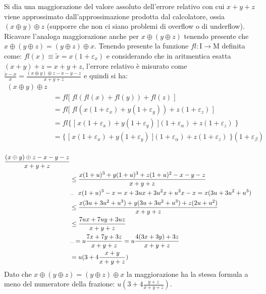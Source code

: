 Si dia una maggiorazione del valore assoluto dell’errore relativo con cui $x + y + z$ viene approssimato dall’approssimazione prodotta dal calcolatore, ossia $(x \oplus y) \oplus z$ (supporre che non ci siano problemi di overflow o di underflow). Ricavare l’analoga maggiorazione anche per $x \oplus (y \oplus z)$ tenendo presente che $x \oplus (y \oplus z) = (y \oplus z) \oplus x$.
\PP
Tenendo presente la funzione $fl: \mathrm{I} \rightarrow \mathrm{M}$ definita come: $fl(x) \equiv \tilde{x} = x(1+\varepsilon_x)$ e considerando che in aritmentica esatta $(x+y)+z = x+y+z$, l'errore relativo è misurato come $\frac{\tilde{x}-x}{x} = \frac{(x \oplus y) \oplus z - x - y - z}{x+y+z}$ e quindi si ha:
\begin{equation*}
	\begin{split}
		(x \oplus y) \oplus z \\
			& = fl \lbrack \; fl(fl(x) + fl(y)) + fl(z) \;\rbrack \\
			& = fl \lbrack \; fl(x(1+\varepsilon_x) + y(1+\varepsilon_y)) + z(1+\varepsilon_z) \; \rbrack \\
			& = fl \{ \; \lbrack \; x(1+\varepsilon_x) + y(1+\varepsilon_y) \; \rbrack (1 + \varepsilon_{\alpha}) + z(1+\varepsilon_z) \; \} \\
	  		& = \{ \; \lbrack \; x(1+\varepsilon_x) + y(1+\varepsilon_y) \; \rbrack (1 + \varepsilon_{\alpha}) + z(1+\varepsilon_z) \; \} (1 + \varepsilon_{\beta}) \\
	\end{split}
\end{equation*}

\begin{equation*}
	\begin{split}
		\frac{(x \oplus y) \oplus z - x - y - z}{x+y+z} \\
			& \leq \frac{x(1+u)^3 + y(1+u)^3 + z(1+u)^2 -x -y -z}{x+y+z} \\
			& \tiny{\text{...} \quad x(1+u)^3 - x = x+3ux+3u^2x+u^3x-x = x(3u+3u^2+u^3)} \\
	 		& \leq \frac{x(3u+3u^2+u^3) + y(3u+3u^2+u^3) + z(2u+u^2)}{x+y+z} \\
	 		& \leq \frac{7ux+7uy+3uz}{x+y+z} \\
			& \tiny{\text{...}} = u\frac{7x+7y+3z}{x+y+z} = u\frac{4(3x+3y)+3z}{x+y+z} \\
	 		& = u(3+4 \frac{x+y}{x+y+z})
	\end{split}
\end{equation*}
Dato che $x \oplus (y \oplus z) = (y \oplus z) \oplus x$ la maggiorazione ha la stessa formula a meno del numeratore della frazione: $ u(3+4 \frac{y+z}{x+y+z})$.

